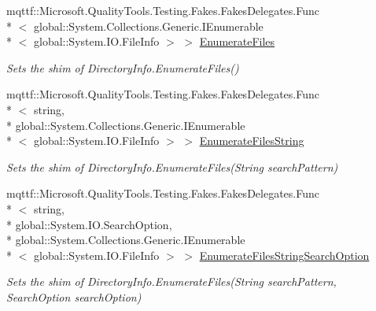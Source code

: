 \begin{DoxyCompactItemize}
mqttf\-::\-Microsoft.\-Quality\-Tools.\-Testing.\-Fakes.\-Fakes\-Delegates.\-Func\\*
$<$ global\-::\-System.\-Collections.\-Generic.\-I\-Enumerable\\*
$<$ global\-::\-System.\-I\-O.\-File\-Info $>$ $>$ \hyperlink{class_system_1_1_i_o_1_1_fakes_1_1_shim_directory_info_af56e4b841f720b8769a4cfc30fe3200e}{Enumerate\-Files}
\begin{DoxyCompactList}\small\item\em Sets the shim of Directory\-Info.\-Enumerate\-Files()\end{DoxyCompactList}\item 
mqttf\-::\-Microsoft.\-Quality\-Tools.\-Testing.\-Fakes.\-Fakes\-Delegates.\-Func\\*
$<$ string, \\*
global\-::\-System.\-Collections.\-Generic.\-I\-Enumerable\\*
$<$ global\-::\-System.\-I\-O.\-File\-Info $>$ $>$ \hyperlink{class_system_1_1_i_o_1_1_fakes_1_1_shim_directory_info_a2838d351c5839cded70dd0d52ed29df5}{Enumerate\-Files\-String}
\begin{DoxyCompactList}\small\item\em Sets the shim of Directory\-Info.\-Enumerate\-Files(\-String search\-Pattern)\end{DoxyCompactList}\item 
mqttf\-::\-Microsoft.\-Quality\-Tools.\-Testing.\-Fakes.\-Fakes\-Delegates.\-Func\\*
$<$ string, \\*
global\-::\-System.\-I\-O.\-Search\-Option, \\*
global\-::\-System.\-Collections.\-Generic.\-I\-Enumerable\\*
$<$ global\-::\-System.\-I\-O.\-File\-Info $>$ $>$ \hyperlink{class_system_1_1_i_o_1_1_fakes_1_1_shim_directory_info_a610d61acb02ff56a479d504818dd1b1d}{Enumerate\-Files\-String\-Search\-Option}
\begin{DoxyCompactList}\small\item\em Sets the shim of Directory\-Info.\-Enumerate\-Files(\-String search\-Pattern, Search\-Option search\-Option)\end{DoxyCompactList}\item 

\end{DoxyCompactItemize}
